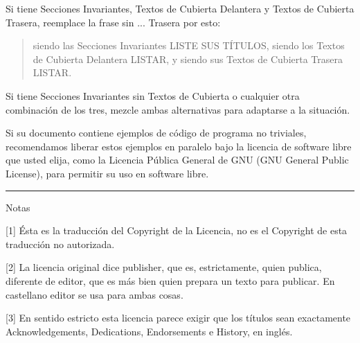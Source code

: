 Si tiene Secciones Invariantes, Textos de Cubierta Delantera y Textos
de Cubierta Trasera, reemplace la frase sin ... Trasera por esto:

\begin{quote}
     siendo las Secciones Invariantes LISTE SUS TÍTULOS, siendo los
     Textos de Cubierta Delantera LISTAR, y siendo sus Textos de
     Cubierta Trasera LISTAR.
\end{quote}

Si tiene Secciones Invariantes sin Textos de Cubierta o cualquier otra
combinación de los tres, mezcle ambas alternativas para adaptarse a la
situación.

Si su documento contiene ejemplos de código de programa no triviales,
recomendamos liberar estos ejemplos en paralelo bajo la licencia de
software libre que usted elija, como la Licencia Pública General de
GNU (GNU General Public License), para permitir su uso en software
libre.

\rule{\linewidth}{1pt}

Notas

[1] Ésta es la traducción del Copyright de la Licencia, no es el Copyright
de esta traducción no autorizada.

[2] La licencia original dice publisher, que es, estrictamente, quien
publica, diferente de editor, que es más bien quien prepara un texto
para publicar. En castellano editor se usa para ambas cosas.

[3] En sentido estricto esta licencia parece exigir que los títulos sean
exactamente Acknowledgements, Dedications, Endorsements e History, en
inglés.



